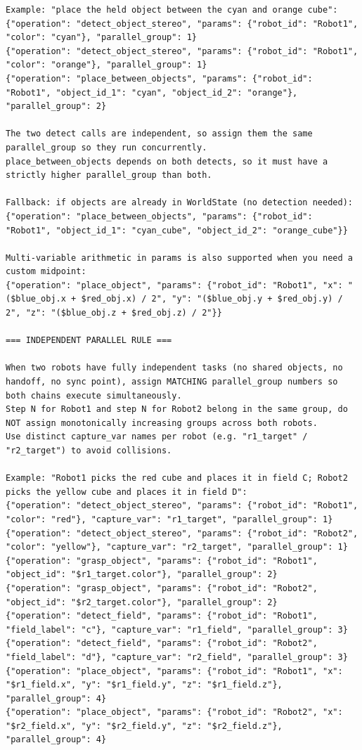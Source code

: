 \begin{lstlisting}[caption={The few-shot and rule-based system prompt for the command parser.}, extendedchars=true]
Example: "place the held object between the cyan and orange cube":
{"operation": "detect_object_stereo", "params": {"robot_id": "Robot1", "color": "cyan"}, "parallel_group": 1}
{"operation": "detect_object_stereo", "params": {"robot_id": "Robot1", "color": "orange"}, "parallel_group": 1}
{"operation": "place_between_objects", "params": {"robot_id": "Robot1", "object_id_1": "cyan", "object_id_2": "orange"}, "parallel_group": 2}

The two detect calls are independent, so assign them the same parallel_group so they run concurrently.
place_between_objects depends on both detects, so it must have a strictly higher parallel_group than both.

Fallback: if objects are already in WorldState (no detection needed):
{"operation": "place_between_objects", "params": {"robot_id": "Robot1", "object_id_1": "cyan_cube", "object_id_2": "orange_cube"}}

Multi-variable arithmetic in params is also supported when you need a custom midpoint:
{"operation": "place_object", "params": {"robot_id": "Robot1", "x": "($blue_obj.x + $red_obj.x) / 2", "y": "($blue_obj.y + $red_obj.y) / 2", "z": "($blue_obj.z + $red_obj.z) / 2"}}

=== INDEPENDENT PARALLEL RULE ===

When two robots have fully independent tasks (no shared objects, no handoff, no sync point), assign MATCHING parallel_group numbers so both chains execute simultaneously.
Step N for Robot1 and step N for Robot2 belong in the same group, do NOT assign monotonically increasing groups across both robots.
Use distinct capture_var names per robot (e.g. "r1_target" / "r2_target") to avoid collisions.

Example: "Robot1 picks the red cube and places it in field C; Robot2 picks the yellow cube and places it in field D":
{"operation": "detect_object_stereo", "params": {"robot_id": "Robot1", "color": "red"}, "capture_var": "r1_target", "parallel_group": 1}
{"operation": "detect_object_stereo", "params": {"robot_id": "Robot2", "color": "yellow"}, "capture_var": "r2_target", "parallel_group": 1}
{"operation": "grasp_object", "params": {"robot_id": "Robot1", "object_id": "$r1_target.color"}, "parallel_group": 2}
{"operation": "grasp_object", "params": {"robot_id": "Robot2", "object_id": "$r2_target.color"}, "parallel_group": 2}
{"operation": "detect_field", "params": {"robot_id": "Robot1", "field_label": "c"}, "capture_var": "r1_field", "parallel_group": 3}
{"operation": "detect_field", "params": {"robot_id": "Robot2", "field_label": "d"}, "capture_var": "r2_field", "parallel_group": 3}
{"operation": "place_object", "params": {"robot_id": "Robot1", "x": "$r1_field.x", "y": "$r1_field.y", "z": "$r1_field.z"}, "parallel_group": 4}
{"operation": "place_object", "params": {"robot_id": "Robot2", "x": "$r2_field.x", "y": "$r2_field.y", "z": "$r2_field.z"}, "parallel_group": 4}


\end{lstlisting}
